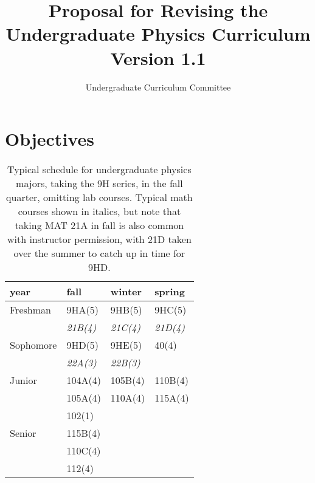 \documentclass[12pt]{article}
\begin{document}

\title{Proposal for Revising the \\ Undergraduate Physics Curriculum \\ Version 1.1}
\author{Undergraduate Curriculum Committee}

\maketitle

\section{Objectives}

\begin{table}
\caption{Typical schedule for undergraduate physics majors, taking the 9H series, in the fall quarter, omitting lab courses.  Typical math courses shown in italics, but note that taking MAT 21A in fall is also common with instructor permission, with 21D taken over the summer to catch up in time for 9HD.}

\label{tbl:current-honors}
\begin{center}
\begin{tabular}{|l|l|l|l|}
\hline
year      & fall    & winter & spring  \\
\hline
Freshman  & 9HA(5)     & 9HB(5)     & 9HC(5) \\
          & {\it 21B(4)}  & {\it 21C(4)}  & {\it 21D(4)} \\
\hline
Sophomore & 9HD(5)     & 9HE(5)     & 40(4)     \\
          & {\it 22A(3)}     & {\it 22B(3)} & \\
\hline
Junior    & 104A(4) & 105B(4) & 110B(4)\\
          & 105A(4) & 110A(4) & 115A(4)\\
          & 102(1)  &      &     \\
\hline
Senior    & 115B(4) &        & \\
          & 110C(4) &        & \\
          & 112(4)  &        & \\

\hline 
\end{tabular}
\end{center}
\end{table}
\end{document}
